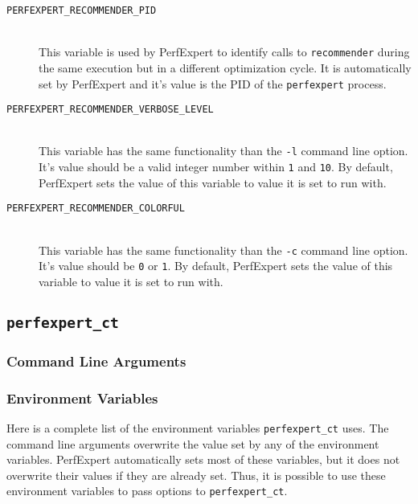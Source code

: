 \begin{description}
	\item[\texttt{PERFEXPERT\_RECOMMENDER\_PID}]\hfill \\
	This variable is used by PerfExpert to identify calls to \texttt{recommender} during the same execution but in a different optimization cycle. It is automatically set by PerfExpert and it's value is the PID of the \texttt{perfexpert} process.

	\item[\texttt{PERFEXPERT\_RECOMMENDER\_VERBOSE\_LEVEL}]\hfill \\
	This variable has the same functionality than the \texttt{-l} command line option. It's value should be a valid integer number within \texttt{1} and \texttt{10}. By default, PerfExpert sets the value of this variable to value it is set to run with.

	\item[\texttt{PERFEXPERT\_RECOMMENDER\_COLORFUL}]\hfill \\
	This variable has the same functionality than the \texttt{-c} command line option. It's value should be \texttt{0} or \texttt{1}. By default, PerfExpert sets the value of this variable to value it is set to run with.
\end{description}

\subsection{\texttt{perfexpert\_ct}}

\subsubsection{Command Line Arguments}

\subsubsection{Environment Variables}

Here is a complete list of the environment variables \texttt{perfexpert\_ct} uses. The command line arguments overwrite the value set by any of the environment variables. PerfExpert automatically sets most of these variables, but it does not overwrite their values if they are already set. Thus, it is possible to use these environment variables to pass options to \texttt{perfexpert\_ct}.

